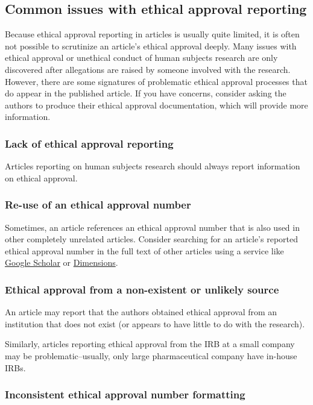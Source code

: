 \documentclass[letterpaper, 12pt]{article}
\begin{document}
\subsection*{Common issues with ethical approval reporting}

Because ethical approval reporting in articles is usually quite limited, it is often not possible to scrutinize an article's ethical approval deeply. Many issues with ethical approval or unethical conduct of human subjects research are only discovered after allegations are raised by someone involved with the research. However, there are some signatures of problematic ethical approval processes that do appear in the published article. If you have concerns, consider asking the authors to produce their ethical approval documentation, which will provide more information.

\subsubsection*{Lack of ethical approval reporting}

Articles reporting on human subjects research should always report information on ethical approval.

\subsubsection*{Re-use of an ethical approval number}

Sometimes, an article references an ethical approval number that is also used in other completely unrelated articles. Consider searching for an article's reported ethical approval number in the full text of other articles using a service like \href{https://scholar.google.com}{Google Scholar} or \href{https://www.dimensions.ai/}{Dimensions}.

\subsubsection*{Ethical approval from a non-existent or unlikely source}

An article may report that the authors obtained ethical approval from an institution that does not exist (or appears to have little to do with the research).

Similarly, articles reporting ethical approval from the IRB at a small company may be problematic--usually, only large pharmaceutical company have in-house IRBs.

\subsubsection*{Inconsistent ethical approval number formatting}
\end{document}
